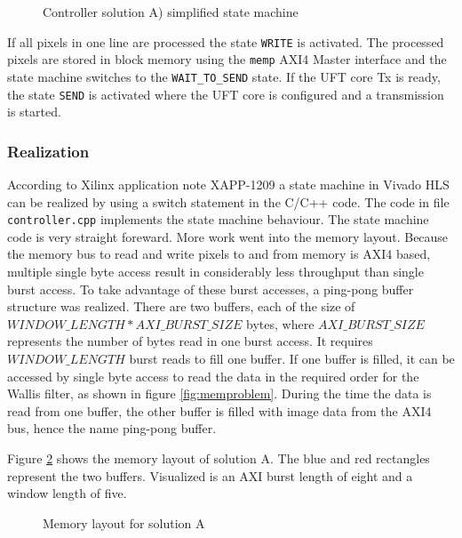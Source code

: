 \begin{figure}[t!]
    \centering
    \begin{adjustbox}{scale=1}
        
    \end{adjustbox}
    \caption{Controller solution A) simplified state machine}
    \label{fig:controllerfsm}
\end{figure}

If all
pixels in one line are processed the state \texttt{WRITE} is activated. The
processed pixels are stored in block memory using the \texttt{memp} AXI4 Master
interface and the state machine switches to the \texttt{WAIT\_TO\_SEND}
state. If the UFT core Tx is ready, the state \texttt{SEND} is activated
where the UFT core is configured and a transmission is started.

\subsubsection*{Realization}
According to Xilinx application note XAPP-1209 \cite{xapp1209} a state
machine in Vivado HLS can be realized by using a switch statement in the C/C++
code.
The code in file \texttt{controller.cpp} implements the state machine behaviour.
The state machine code is very straight foreward. More work went into the memory
layout. Because the memory bus to read and write pixels to and from memory is
AXI4 based, multiple single byte access result in considerably less throughput
than single burst access.
To take advantage of these burst accesses, a ping-pong buffer structure was
realized. There are two buffers, each of the size of $WINDOW\_LENGTH *
AXI\_BURST\_SIZE$ bytes, where $AXI\_BURST\_SIZE$ represents the number of bytes
read
in one burst access. It requires $WINDOW\_LENGTH$ burst reads to fill one
buffer. If one buffer is filled, it can be accessed by single byte access to
read the data in the required order for the Wallis filter, as shown in figure
\ref{fig:memproblem}. During the time the data is read from one buffer, the
other buffer is filled with image data from the AXI4 bus, hence the name
ping-pong buffer. 

Figure \ref{fig:solamemlayout} shows the memory layout of
solution A. The blue and red rectangles represent the two buffers. Visualized is
an AXI burst length of eight and a window length of five.

\clearpage

\begin{figure}[tb!]
    \centering
    \begin{adjustbox}{scale=0.7}
        
    \end{adjustbox}
    \caption{Memory layout for solution A}
    \label{fig:solamemlayout}
\end{figure}

